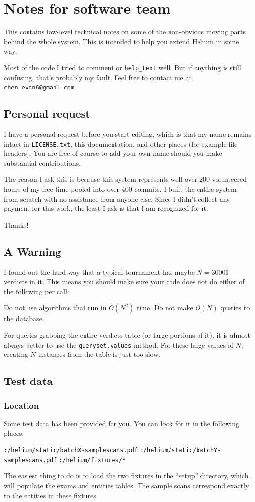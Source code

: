 \chapter{Notes for software team}
This contains low-level technical notes on some of the non-obvious
moving parts behind the whole system.
This is intended to help you extend Helium in some way.

Most of the code I tried to comment or \verb+help_text+ well.
But if anything is still confusing, that's probably my fault.
Feel free to contact me at \texttt{chen.evan6@gmail.com}.

\section{Personal request}
I have a personal request before you start editing,
which is that my name remains intact in \texttt{LICENSE.txt},
this documentation, and other places (for example file headers).
You are free of course to add your own name
should you make substantial contributions.

The reason I ask this is because this system represents
well over $200$ volunteered hours of my free time
pooled into over $400$ commits.
I built the entire system from scratch with no assistance from anyone else.
Since I didn't collect any payment for this work,
the least I ask is that I am recognized for it.

Thanks!

\section{A Warning}
I found out the hard way that a typical tournament has maybe $N = 30000$ verdicts in it.
This means you should make sure your code does not do either of the following per call:
\begin{itemize}
	\ii Do not use algorithms that run in $O(N^2)$ time.
	\ii Do not make $O(N)$ queries to the database.
\end{itemize}
For queries grabbing the entire verdicts table (or large portions of it),
it is almost always better to use the \texttt{queryset.values} method.
For these large values of $N$, creating $N$ instances from the table is just too slow.

\section{Test data}
\subsection{Location}
Some test data has been provided for you.
You can look for it in the following places:
\begin{itemize}
	\ii \verb+:/helium/static/batchX-samplescans.pdf+
	\ii \verb+:/helium/static/batchY-samplescans.pdf+
	\ii \verb+:/helium/fixtures/*+
\end{itemize}
The easiest thing to do is to load the two fixtures in the ``setup'' directory,
which will populate the exams and entities tables.
The sample scans correspond exactly to the entities in these fixtures.

